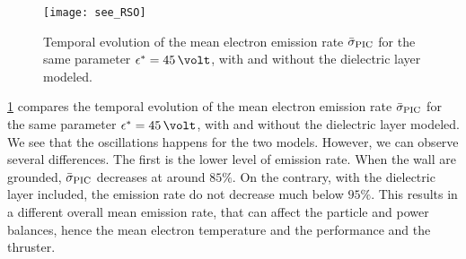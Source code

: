   
  \begin{figure}[hbtp]
    \centering
    \texttt{[image: see\_RSO]}
    \caption{Temporal evolution of the mean electron emission rate $ \bar{\sigma }_{\rm PIC}$ for the same parameter $\crover=45\,\volt$, with and without the dielectric layer modeled.}
    \label{fig-rso_diel}
  \end{figure}
  
  \cref{fig-rso_diel} compares the temporal evolution of the mean electron emission rate $ \bar{\sigma }_{\rm PIC}$ for the same parameter $\crover=45\,\volt$, with and without the dielectric layer modeled.
  We see that the oscillations happens for the two models.
  However, we can observe several differences.
  The first is the lower level of emission rate.
  When the wall are grounded, $ \bar{\sigma }_{\rm PIC}$ decreases at around $85\%$.
  On the contrary, with the dielectric layer included, the emission rate do not decrease much below $95\%$.
  This results in a different overall mean emission rate, that can affect the particle and power balances, hence the mean electron temperature and the performance and the thruster.
  
  
  
  
  
